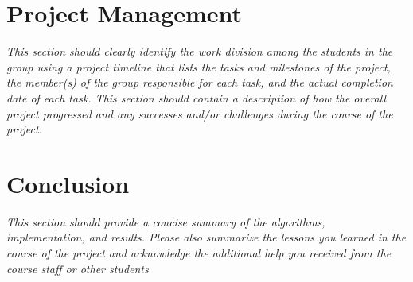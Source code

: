\documentclass[10pt]{article}
\begin{document}
\section{Project Management}
\textit{This section should clearly identify the work division among the students in
the group using a project timeline that lists the tasks and milestones of the project, the member(s) of
the group responsible for each task, and the actual completion date of each task. This section should
contain a description of how the overall project progressed and any successes and/or challenges during
the course of the project.}

\section{Conclusion}

\textit{This section should provide a concise summary of the algorithms, implementation, and results. Please also summarize the lessons you learned in the course of
the project and acknowledge the additional help you received from the course staff or other students}
\end{document}
